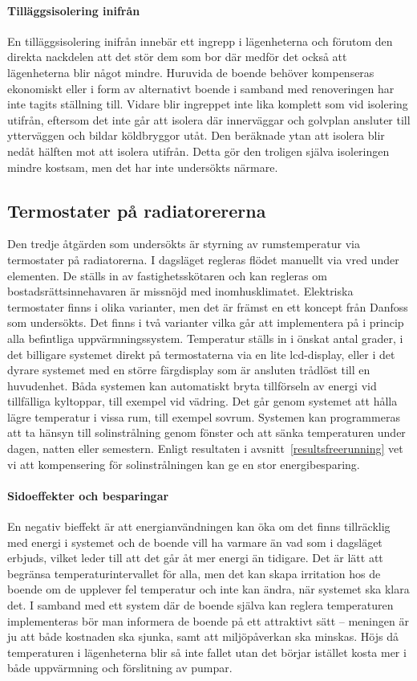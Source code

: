 \paragraph{Tilläggsisolering inifrån}
En tilläggsisolering inifrån innebär ett ingrepp i lägenheterna och förutom den direkta nackdelen att det stör dem som bor där medför det också att lägenheterna blir något mindre. Huruvida de boende behöver kompenseras ekonomiskt eller i form av alternativt boende i samband med renoveringen har inte tagits ställning till. Vidare blir ingreppet inte lika komplett som vid isolering utifrån, eftersom det inte går att isolera där innerväggar och golvplan ansluter till ytterväggen och bildar köldbryggor utåt. Den beräknade ytan att isolera blir nedåt hälften mot att isolera utifrån. Detta gör den troligen själva isoleringen mindre kostsam, men det har inte undersökts närmare.

\subsection{Termostater på radiatorererna}
Den tredje åtgärden som undersökts är styrning av rumstemperatur via termostater på radiatorerna. I dagsläget regleras flödet manuellt via vred under elementen. De ställs in av fastighetsskötaren och kan regleras om bostadsrättsinnehavaren är missnöjd med inomhusklimatet. Elektriska termostater finns i olika varianter, men det är främst en ett koncept från Danfoss som undersökts. Det finns i två varianter vilka går att implementera på i princip alla befintliga uppvärmningssystem. Temperatur ställs in i önskat antal grader, i det billigare systemet direkt på termostaterna via en lite lcd-display, eller i det dyrare systemet med en större färgdisplay som är ansluten trådlöst till en huvudenhet. Båda systemen kan automatiskt bryta tillförseln av energi vid tillfälliga kyltoppar, till exempel vid vädring. Det går genom systemet att hålla lägre temperatur i vissa rum, till exempel sovrum. Systemen kan programmeras att ta hänsyn till solinstrålning genom fönster och att sänka temperaturen under dagen, natten eller semestern. Enligt resultaten i avsnitt~\ref{resultsfreerunning} vet vi att kompensering för solinstrålningen kan ge en stor energibesparing.

\paragraph{Sidoeffekter och besparingar}
En negativ bieffekt är att energianvändningen kan öka om det finns tillräcklig med energi i systemet och de boende vill ha varmare än vad som i dagsläget erbjuds, vilket leder till att det går åt mer energi än tidigare. Det är lätt att begränsa temperaturintervallet för alla, men det kan skapa irritation hos de boende om de upplever fel temperatur och inte kan ändra, när systemet ska klara det. I samband med ett system där de boende själva kan reglera temperaturen implementeras bör man informera de boende på ett attraktivt sätt – meningen är ju att både kostnaden ska sjunka, samt att miljöpåverkan ska minskas. Höjs då temperaturen i lägenheterna blir så inte fallet utan det börjar istället kosta mer i både uppvärmning och förslitning av pumpar. \cite{viivilla}

